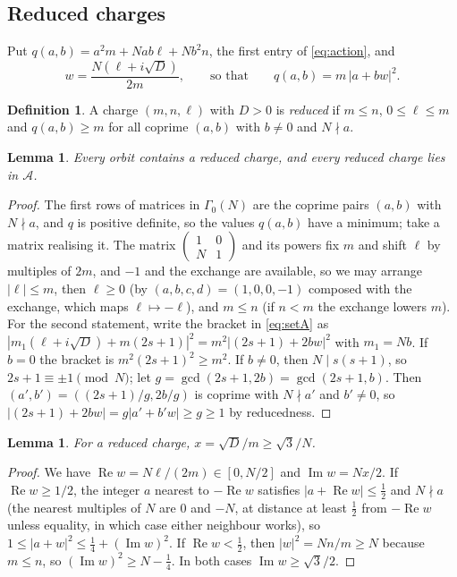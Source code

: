 \documentclass[11pt]{amsart}
\numberwithin{equation}{section}
\theoremstyle{plain}
\newtheorem{lem}[thm]{Lemma}
\theoremstyle{definition}
\newtheorem{defn}[thm]{Definition}
\theoremstyle{remark}
\newcommand{\cA}{\mathcal{A}}
\newcommand{\sm}[4]{\left(\begin{smallmatrix}#1&#2\\#3&#4\end{smallmatrix}\right)}
\begin{document}
\subsection{Reduced charges}
Put $q(a,b)=a^2m+Nab\ell+Nb^2n$, the first entry of \eqref{eq:action}, and
\[
w=\frac{N(\ell+i\sqrt D)}{2m},\qquad\text{so that}\qquad q(a,b)=m\,|a+bw|^2 .
\]
\begin{defn}
A charge $(m,n,\ell)$ with $D>0$ is \emph{reduced} if $m\le n$, $0\le\ell\le m$ and $q(a,b)\ge m$ for all coprime $(a,b)$ with $b\ne0$ and $N\nmid a$.
\end{defn}

\begin{lem}\label{lem:redA}
Every orbit contains a reduced charge, and every reduced charge lies in $\cA$.
\end{lem}

\begin{proof}
The first rows of matrices in $\Gamma_0(N)$ are the coprime pairs $(a,b)$ with $N\nmid a$, and $q$ is positive definite, so the values $q(a,b)$ have a minimum; take a matrix realising it. The matrix $\sm10{N}1$ and its powers fix $m$ and shift $\ell$ by multiples of $2m$, and $-1$ and the exchange are available, so we may arrange $|\ell|\le m$, then $\ell\ge0$ (by $(a,b,c,d)=(1,0,0,-1)$ composed with the exchange, which maps $\ell\mapsto-\ell$), and $m\le n$ (if $n<m$ the exchange lowers $m$). For the second statement, write the bracket in \eqref{eq:setA} as $|m_1(\ell+i\sqrt D)+m(2s+1)|^2=m^2|(2s+1)+2bw|^2$ with $m_1=Nb$. If $b=0$ the bracket is $m^2(2s+1)^2\ge m^2$. If $b\ne0$, then $N\mid s(s+1)$, so $2s+1\equiv\pm1\pmod N$; let $g=\gcd(2s+1,2b)=\gcd(2s+1,b)$. Then $(a',b')=((2s+1)/g,2b/g)$ is coprime with $N\nmid a'$ and $b'\ne0$, so $|(2s+1)+2bw|=g|a'+b'w|\ge g\ge1$ by reducedness.
\end{proof}

\begin{lem}\label{lem:xmin}
For a reduced charge, $x=\sqrt D/m\ge\sqrt3/N$.
\end{lem}

\begin{proof}
We have $\operatorname{Re}w=N\ell/(2m)\in[0,N/2]$ and $\operatorname{Im}w=Nx/2$. If $\operatorname{Re}w\ge1/2$, the integer $a$ nearest to $-\operatorname{Re}w$ satisfies $|a+\operatorname{Re}w|\le\frac12$ and $N\nmid a$ (the nearest multiples of $N$ are $0$ and $-N$, at distance at least $\frac12$ from $-\operatorname{Re}w$ unless equality, in which case either neighbour works), so $1\le|a+w|^2\le\frac14+(\operatorname{Im}w)^2$. If $\operatorname{Re}w<\frac12$, then $|w|^2=Nn/m\ge N$ because $m\le n$, so $(\operatorname{Im}w)^2\ge N-\frac14$. In both cases $\operatorname{Im}w\ge\sqrt3/2$.
\end{proof}
\end{document}
